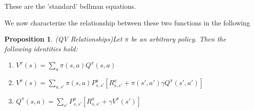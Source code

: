 \documentclass[11pt]{article} %
\newtheorem{prop}{Proposition}
\begin{document}
These are the 'standard' bellman equations.

We now characterize the relationship between these two functions in the following

\begin{prop}{(QV Relationships)}\label{prop_qVRelShips}
	Let $\pi$ be an arbitrary policy. Then the following identities hold:
	\begin{enumerate}
		\item $V^{\pi}(s) = \sum_a \pi(s,a) Q^{\pi}(s,a)$ \\
		\item $V^{\pi}(s) = \sum_{a,s'}  \pi(s,a) P_{s,s'}^a [ R_{s,s'}^a + \pi(s',a') \gamma Q^{\pi}(s',a')] $ \\
		\item $Q^{\pi}(s,a) = \sum_{s'} P_{s,s'}^a [ R_{s,s'}^a + \gamma V^{\pi}(s') ] $
	\end{enumerate}
\end{prop}
\end{document}
